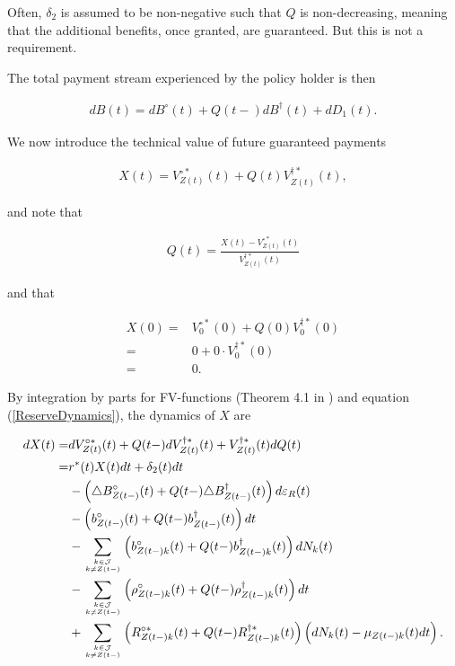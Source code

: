 \documentclass{article}
\newcommand{\1}[1]{\mathbbm{1}_{\left\lbrace #1 \right\rbrace}}
\theoremstyle{break}
\theoremstyle{remark}
\newenvironment{remark}
  {\pushQED{\qed}\renewcommand{\qedsymbol}{\scalebox{1.4}{$\circ$}}\remarkx}
  {\popQED\endremarkx}
\numberwithin{equation}{section}
\begin{document}
\begin{remark}
	Often, $\delta_2$ is assumed to be non-negative such that $Q$ is non-decreasing, meaning that the additional benefits, once granted, are guaranteed. But this is not a requirement.
\end{remark}

The total payment stream experienced by the policy holder is then

\begin{align} \label{WithProfitTotalBenefits}
dB(t) = dB^\circ(t) + Q(t-) dB^\dagger(t) + dD_1(t).
\end{align}

We now introduce the technical value of future guaranteed payments

\begin{align} \label{XDef}
X(t) = V_{Z(t)}^{\circ*}(t) + Q(t) V_{Z(t)}^{\dagger*}(t),
\end{align}

and note that 

\begin{align*}
	Q(t) = \frac{X(t) - V_{Z(t)}^{\circ*}(t)}{V_{Z(t)}^{\dagger*}(t)}
\end{align*}

and that

\begin{align*}
X(0) =& V_{0}^{\circ*}(0) + Q(0) V_{0}^{\dagger*}(0) \\
=& 0 + 0 \cdot V_{0}^{\dagger*}(0) \\
=& 0.
\end{align*}

By integration by parts for FV-functions (Theorem 4.1 in \cite{LivStok}) and equation (\ref{ReserveDynamics}), the dynamics of $X$ are

\begin{align} \label{XDynamics}
\begin{split}
dX(t) =& dV_{Z(t)}^{\circ*}(t) + Q(t-) dV_{Z(t)}^{\dagger*}(t) + V_{Z(t)}^{\dagger*}(t) dQ(t) \\
=& r^*(t) X(t) dt + \delta_2(t)dt \\
&- \left( \triangle B_{Z(t-)}^\circ(t) + Q(t-) \triangle B_{Z(t-)}^\dagger(t) \right) d \varepsilon_{R}(t) \\
&- \left( b_{Z(t-)}^\circ(t) + Q(t-) b_{Z(t-)}^\dagger(t) \right) dt \\
&- \sum_{k \in \mathcal{J} \atop k \neq Z(t-)} \left( b_{Z(t-)k}^\circ(t) + Q(t-) b_{Z(t-)k}^\dagger(t)\right) dN_k(t) \\
&- \sum_{k \in \mathcal{J} \atop k \neq Z(t-)} \left( \rho_{Z(t-)k}^\circ(t) + Q(t-) \rho_{Z(t-)k}^\dagger(t) \right) dt \\
&+ \sum_{k \in \mathcal{J} \atop k \neq Z(t-)} \left( R_{Z(t-)k}^{\circ*}(t) + Q(t-) R_{Z(t-)k}^{\dagger*}(t) \right) \left( dN_k(t) - \mu_{Z(t-)k}(t) dt \right).
\end{split}
\end{align}
\end{document}
